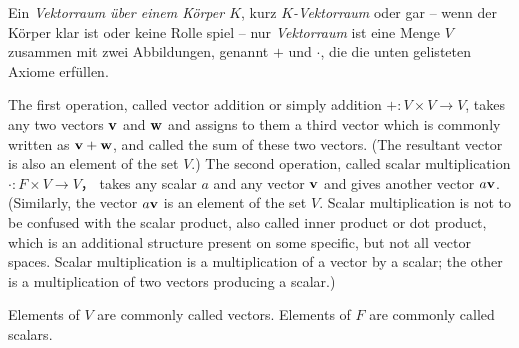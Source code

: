 \begin{definition}[Vektorräume]
	Ein \emph{Vektorraum über einem Körper $K$}, kurz \emph{$K$-Vektorraum} oder gar -- wenn der Körper klar ist oder keine Rolle spiel -- nur \emph{Vektorraum} ist eine Menge $V$ zusammen mit zwei Abbildungen, genannt $+$ und $\cdot$, die die unten gelisteten Axiome erfüllen.
	
	The first operation, called vector addition or simply addition $+ : V \times V \to V$, takes any two vectors $\mathbf{v}$ and $\mathbf{w}$ and assigns to them a third vector which is commonly written as $\mathbf{v} + \mathbf{w}$, and called the sum of these two vectors. (The resultant vector is also an element of the set $V$.)
	The second operation, called scalar multiplication $\cdot : F \times V \to V$， takes any scalar $a$ and any vector $\mathbf{v}$ and gives another vector $a\mathbf{v}$. (Similarly, the vector $a\mathbf{v}$ is an element of the set $V$. Scalar multiplication is not to be confused with the scalar product, also called inner product or dot product, which is an additional structure present on some specific, but not all vector spaces. Scalar multiplication is a multiplication of a vector by a scalar; the other is a multiplication of two vectors producing a scalar.)
	
	Elements of $V$ are commonly called vectors. Elements of $F$ are commonly called scalars.
	

\end{definition}

